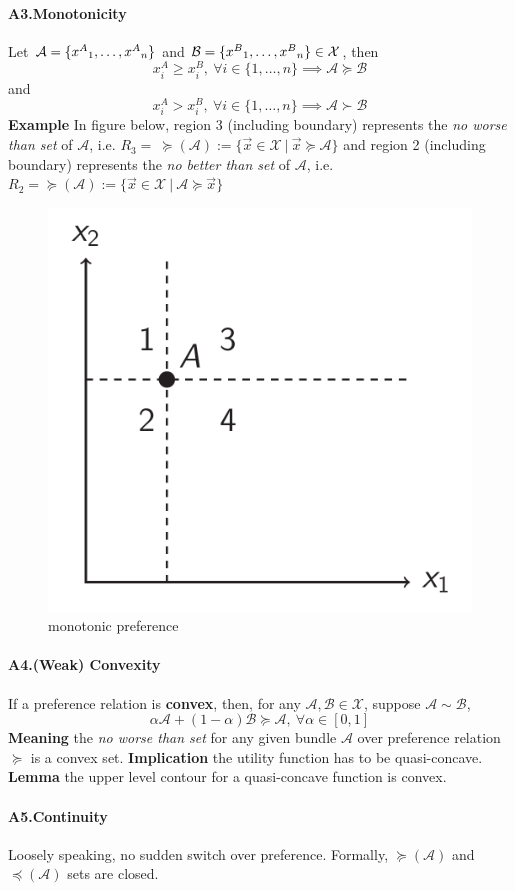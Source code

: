 \documentclass{article}
\newcommand{\mc}[1]{\mathcal{#1}}
\begin{document}
			\paragraph{A3.Monotonicity} Let $\mc{A} = \sset{x^A}{1}{n}$ and $\mc{B} = \sset{x^B}{1}{n} \in \mc{X}$, then 
			\[
				x^A_i \geq x^B_i,\ \forall i \in \{1,\dots,n\} \implies \mc{A} \succcurlyeq \mc{B}
			\]
			and 
			\[
				x^A_i > x^B_i,\ \forall i \in \{1,\dots,n\} \implies \mc{A} \succ \mc{B}		
			\]
			\textbf{Example} In figure below, region 3 (including boundary) represents the \emph{no worse than set} of $\mc{A}$, i.e. $R_3 = \ \succcurlyeq(\mc{A}) := \{\vec{x} \in \mc{X}\ |\ \vec{x} \succcurlyeq \mc{A}\}$ and region 2 (including boundary) represents the \emph{no better than set} of $\mc{A}$, i.e. $R_2 = \succcurlyeq(\mc{A}) := \{\vec{x} \in \mc{X}\ | \ \mc{A} \succcurlyeq \vec{x}\} $
			\begin{figure}[h]
				\centering
				\includegraphics[width=0.5\linewidth ]{figure/lec2_1}
				\caption{monotonic preference}
			\end{figure}
			
			\paragraph{A4.(Weak) Convexity} If a preference relation is \textbf{convex}, then, for any $\mc{A}, \mc{B} \in \mc{X}$, suppose $\mc{A} \sim \mc{B}$,
			\[
				\alpha \mc{A} + (1-\alpha) \mc{B} \succcurlyeq \mc{A},\ \forall \alpha \in [0,1]
			\]
			\textbf{Meaning} the \emph{no worse than set} for any given bundle $\mc{A}$ over preference relation $\succcurlyeq$ is a convex set.
			\newline 
			\textbf{Implication} the utility function has to be quasi-concave.
			\newline
			\textbf{Lemma} the upper level contour for a quasi-concave function is convex.
			\paragraph{A5.Continuity} Loosely speaking, no sudden switch over preference. Formally, $\succcurlyeq(\mc{A})$ and $\preccurlyeq(\mc{A})$ sets are closed.
		
\end{document}
